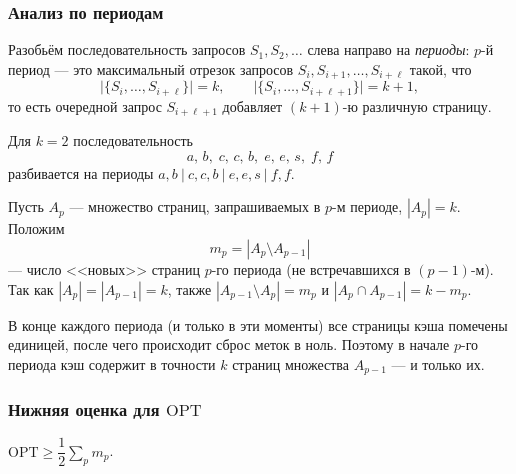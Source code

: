 \subsubsection*{Анализ по периодам}

\begin{Definition}{}{}
	Разобьём последовательность запросов $S_1, S_2, \ldots$ слева направо на \emph{периоды}: $p$-й период --- это максимальный отрезок запросов $S_i, S_{i+1}, \ldots, S_{i+\ell}$ такой, что
	\[
	\bigl|\{S_i,\ldots,S_{i+\ell}\}\bigr| = k,
	\qquad
	\bigl|\{S_i,\ldots,S_{i+\ell+1}\}\bigr| = k+1,
	\]
	то есть очередной запрос $S_{i+\ell+1}$ добавляет $(k+1)$-ю различную страницу.
\end{Definition}

\begin{Example}{}{}
	Для $k = 2$ последовательность
	\[
	a,\,b,\;c,\,c,\,b,\;e,\,e,\,s,\;f,\,f
	\]
	разбивается на периоды $a,b \ \big|\ c,c,b \ \big|\ e,e,s \ \big|\ f,f$.
\end{Example}

\begin{Definition}{}{}
	Пусть $A_p$ --- множество страниц, запрашиваемых в $p$-м периоде, $|A_p| = k$. Положим
	\[
	m_p = |A_p \setminus A_{p-1}|
	\]
	--- число <<новых>> страниц $p$-го периода (не встречавшихся в $(p-1)$-м). Так как $|A_p| = |A_{p-1}| = k$, также $|A_{p-1} \setminus A_p| = m_p$ и $|A_p \cap A_{p-1}| = k - m_p$.
\end{Definition}

\begin{Remark}{}{}
	В конце каждого периода (и только в эти моменты) все страницы кэша помечены единицей, после чего происходит сброс меток в ноль. Поэтому в начале $p$-го периода кэш содержит в точности $k$ страниц множества $A_{p-1}$ --- и только их.
\end{Remark}

\subsubsection*{Нижняя оценка для $\mathrm{OPT}$}

\begin{Lemma}{}{}
	$\mathrm{OPT} \geq \dfrac{1}{2}\displaystyle\sum_{p} m_p$.
\end{Lemma}

